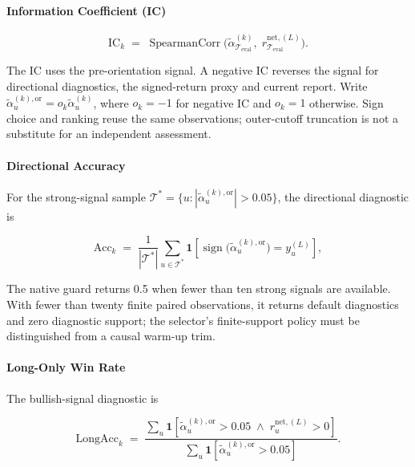 \paragraph{Information Coefficient (IC)}

\begin{equation}
    \mathrm{IC}_k \;=\;
    \operatorname{SpearmanCorr}\!\bigl(
        \tilde{\alpha}^{(k)}_{\mathcal{T}_{\mathrm{eval}}},\;
        r^{\mathrm{net},(L)}_{\mathcal{T}_{\mathrm{eval}}}
    \bigr).
    \label{eq:ic}
\end{equation}


The IC uses the pre-orientation signal. A negative IC reverses the signal for directional diagnostics, the signed-return proxy and current report. Write $\tilde{\alpha}^{(k),\mathrm{or}}_u=o_k\tilde{\alpha}^{(k)}_u$, where $o_k=-1$ for negative IC and $o_k=1$ otherwise. Sign choice and ranking reuse the same observations; outer-cutoff truncation is not a substitute for an independent assessment.

\paragraph{Directional Accuracy}
For the strong-signal sample $\mathcal{T}^{*}=\{u:|\tilde{\alpha}^{(k),\mathrm{or}}_u|>0.05\}$, the directional diagnostic is

\begin{equation}
    \mathrm{Acc}_k \;=\;
    \frac{1}{|\mathcal{T}^*|}
    \sum_{u \in \mathcal{T}^*}
    \mathbf{1}\!\left[
        \operatorname{sign}\!\bigl(\tilde{\alpha}^{(k),\mathrm{or}}_u\bigr)
        = y^{(L)}_u
    \right],
\end{equation}


The native guard returns 0.5 when fewer than ten strong signals are available. With fewer than twenty finite paired observations, it returns default diagnostics and zero diagnostic support; the selector's finite-support policy must be distinguished from a causal warm-up trim.

\paragraph{Long-Only Win Rate}
The bullish-signal diagnostic is

\begin{equation}
    \mathrm{LongAcc}_k \;=\;
    \frac{
        \sum_u \mathbf{1}\!\left[
            \tilde{\alpha}^{(k),\mathrm{or}}_u > 0.05 \;\wedge\; r^{\mathrm{net},(L)}_u > 0
        \right]
    }{
        \sum_u \mathbf{1}\!\left[
            \tilde{\alpha}^{(k),\mathrm{or}}_u > 0.05
        \right]
    }.
\end{equation}


